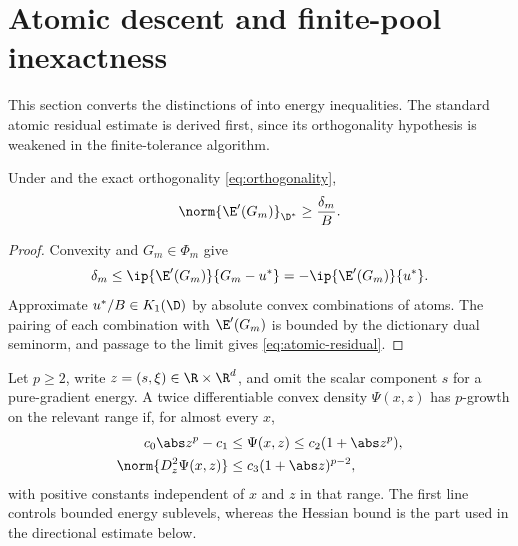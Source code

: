 \section{Atomic descent and finite-pool inexactness}
\label{sec:descent}

This section converts the distinctions of  into energy inequalities. The standard
atomic residual estimate is derived first, since its orthogonality hypothesis is weakened in the
finite-tolerance algorithm.

\begin{lemma}
\label{lem:atomic-residual}
Under  and the exact orthogonality \cref{eq:orthogonality},
\begin{equation}
  \norm{\E'(G_m)}_{\D^*}\geq \frac{\delta_m}{B}.
\label{eq:atomic-residual}
\end{equation}
\end{lemma}

\begin{proof}
Convexity and \(G_m\in\Phi_m\) give
\[
 \delta_m\leq\ip{\E'(G_m)}{G_m-u^*}
 =-\ip{\E'(G_m)}{u^*}.
\]
Approximate \(u^*/B\in K_1(\D)\) by absolute convex combinations of atoms. The pairing of each
combination with \(\E'(G_m)\) is bounded by the dictionary dual seminorm, and passage to the limit gives
\cref{eq:atomic-residual}.
\end{proof}

\begin{definition}
\label{def:p-growth}
Let \(p\geq2\), write \(z=(s,\xi)\in\R\times\R^d\), and omit the scalar component \(s\) for a
pure-gradient energy. A twice differentiable convex density \(\Psi(x,z)\) has \(p\)-growth on the
relevant range if, for almost every \(x\),
\begin{align*}
 c_0\abs z^p-c_1&\leq \Psi(x,z)\leq c_2(1+\abs z^p),\\
 \norm{D_z^2\Psi(x,z)}&\leq c_3(1+\abs z)^{p-2},
\end{align*}
with positive constants independent of \(x\) and \(z\) in that range. The first line controls bounded
energy sublevels, whereas the Hessian bound is the part used in the directional estimate below.
\end{definition}


